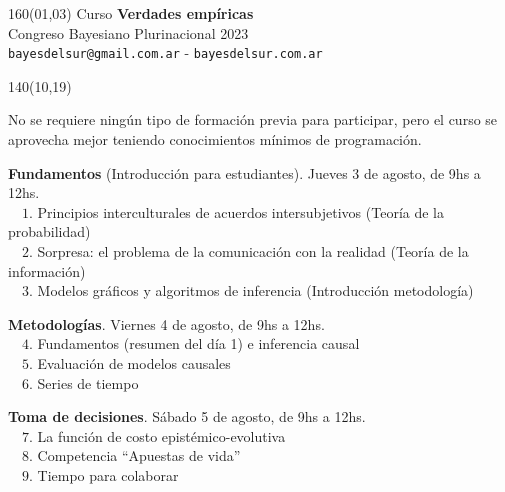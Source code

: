 \documentclass[shownotes,aspectratio=169]{beamer}
\begin{document}
\begin{frame}

\begin{textblock}{160}(01,03)\centering
\textcolor{black!85}{{\large
\large Curso \textbf{Verdades empíricas} \\[-0.1cm] \footnotesize Congreso Bayesiano Plurinacional 2023}} \\ \scriptsize \texttt{bayesdelsur@gmail.com.ar} - \texttt{bayesdelsur.com.ar}
\end{textblock}



\begin{textblock}{140}(10,19)

\normalsize
 No se requiere ningún tipo de formación previa para participar, pero el curso se aprovecha mejor teniendo conocimientos mínimos de programación.

\vspace{0.3cm}

\normalsize \textbf{Fundamentos} (Introducción para estudiantes). Jueves 3 de agosto, de 9hs a 12hs. \\[0.1cm] \footnotesize
\ \ $1$. Principios interculturales de acuerdos intersubjetivos (Teoría de la probabilidad) \\
\ \ $2$. Sorpresa: el problema de la comunicación con la realidad (Teoría de la información) \\
\ \ $3$. Modelos gráficos y algoritmos de inferencia (Introducción metodología)\\

 \vspace{0.3cm}

\normalsize \textbf{Metodologías}. Viernes 4 de agosto, de 9hs a 12hs.\scriptsize  \\[0.1cm] \footnotesize
\ \ $4$. Fundamentos (resumen del día 1) e inferencia causal \\
\ \ $5$. Evaluación de modelos causales \\
\ \ $6$. Series de tiempo \\

\vspace{0.3cm}

\normalsize \textbf{Toma de decisiones}. Sábado 5 de agosto, de 9hs a 12hs.\scriptsize  \\[0.1cm] \footnotesize
\ \ $7$. La función de costo epistémico-evolutiva\\
\ \ $8$. Competencia ``Apuestas de vida'' \\
\ \ $9$. Tiempo para colaborar

\end{textblock}

\end{frame}
\end{document}
